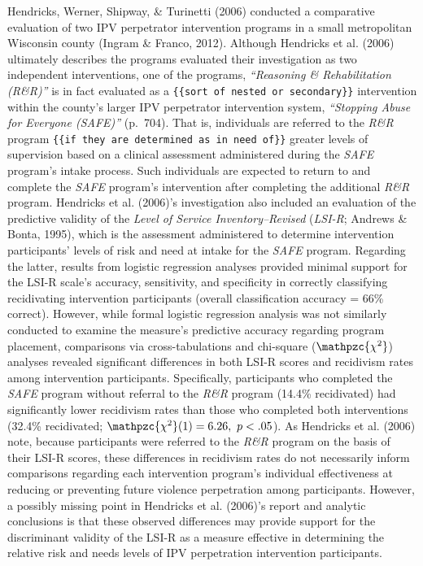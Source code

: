 \documentclass[11pt,]{tufte-book}
\newcommand{\chisq}{\mathpzc{\chi^{2}}}
\begin{document}
Hendricks, Werner, Shipway, \& Turinetti (2006) conducted a comparative
evaluation of two IPV perpetrator intervention programs in a small
metropolitan Wisconsin county (Ingram \& Franco, 2012). Although
Hendricks et al. (2006) ultimately describes the programs evaluated
their investigation as two independent interventions, one of the
programs, \emph{``Reasoning \& Rehabilitation (R\&R)''} is in fact
evaluated as a \texttt{\{\{sort\ of\ nested\ or\ secondary\}\}}
intervention within the county's larger IPV perpetrator intervention
system, \emph{``Stopping Abuse for Everyone (SAFE)''} (p.~704). That is,
individuals are referred to the \emph{R\&R} program
\texttt{\{\{if\ they\ are\ determined\ as\ in\ need\ of\}\}} greater
levels of supervision based on a clinical assessment administered during
the \emph{SAFE} program's intake process. Such individuals are expected
to return to and complete the \emph{SAFE} program's intervention after
completing the additional \emph{R\&R} program. Hendricks et al. (2006)'s
investigation also included an evaluation of the predictive validity of
the \emph{Level of Service Inventory--Revised} (\emph{LSI-R}; Andrews \&
Bonta, 1995), which is the assessment administered to determine
intervention participants' levels of risk and need at intake for the
\emph{SAFE} program. Regarding the latter, results from logistic
regression analyses provided minimal support for the LSI-R scale's
accuracy, sensitivity, and specificity in correctly classifying
recidivating intervention participants (overall classification accuracy
= 66\% correct). However, while formal logistic regression analysis was
not similarly conducted to examine the measure's predictive accuracy
regarding program placement, comparisons via cross-tabulations and
chi-square (\(\chisq\)) analyses revealed significant differences in
both LSI-R scores and recidivism rates among intervention participants.
Specifically, participants who completed the \emph{SAFE} program without
referral to the \emph{R\&R} program (14.4\% recidivated) had
significantly lower recidivism rates than those who completed both
interventions (32.4\% recidivated; \(\chisq(1) = 6.26,~p < .05\)). As
Hendricks et al. (2006) note, because participants were referred to the
\emph{R\&R} program on the basis of their LSI-R scores, these
differences in recidivism rates do not necessarily inform comparisons
regarding each intervention program's individual effectiveness at
reducing or preventing future violence perpetration among participants.
However, a possibly missing point in Hendricks et al. (2006)'s report
and analytic conclusions is that these observed differences may provide
support for the discriminant validity of the LSI-R as a measure
effective in determining the relative risk and needs levels of IPV
perpetration intervention participants.
\end{document}
